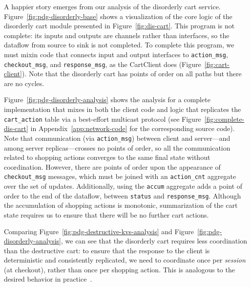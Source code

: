 A happier story emerges from our analysis of the disorderly cart service.
Figure~\ref{fig:pdg-disorderly-base} shows a visualization of the core logic of
the disorderly cart module presented in Figure~\ref{fig:dis-cart}.  This program
is not complete: its inputs and outputs are channels rather than interfaces, so
the dataflow from source to sink is not completed.  To complete this program, we
must mixin code that connects input and output interfaces to
\texttt{action\_msg}, \texttt{checkout\_msg}, and \texttt{response\_msg}, as the
CartClient does (Figure~\ref{fig:cart-client}).  Note that the disorderly cart
has points of order on all paths but there are no cycles.

Figure~\ref{fig:pdg-disorderly-analysis} shows the analysis for a complete
implementation that mixes in both the client code and logic that replicates the
\texttt{cart\_action} table via a best-effort multicast protocol (see
Figure~\ref{fig:complete-dis-cart} in Appendix~\ref{app:network-code} for the
corresponding source code).  Note that communication (via \texttt{action\_msg})
between client and server---and among server replicas---crosses no points of
order, so all the communication related to shopping actions converges to the
same final state without coordination.  However, there are points of order upon
the appearance of \texttt{checkout\_msg} messages, which must be joined with an
\texttt{action\_cnt} aggregate over the set of updates.  Additionally, using the
\texttt{accum} aggregate adds a point of order to the end of the dataflow,
between \texttt{status} and \texttt{response\_msg}.  Although the accumulation
of shopping actions is monotonic, summarization of the cart state requires us to
ensure that there will be no further cart actions.

Comparing Figure~\ref{fig:pdg-destructive-kvs-analysis} and
Figure~\ref{fig:pdg-disorderly-analysis}, we can see that the disorderly cart
requires less coordination than the destructive cart: to ensure that the
response to the client is deterministic and consistently replicated, we need to
coordinate once per {\em session} (at checkout), rather than once per shopping
action.  This is analogous to the desired behavior in practice~\cite{quicksand}.
%

